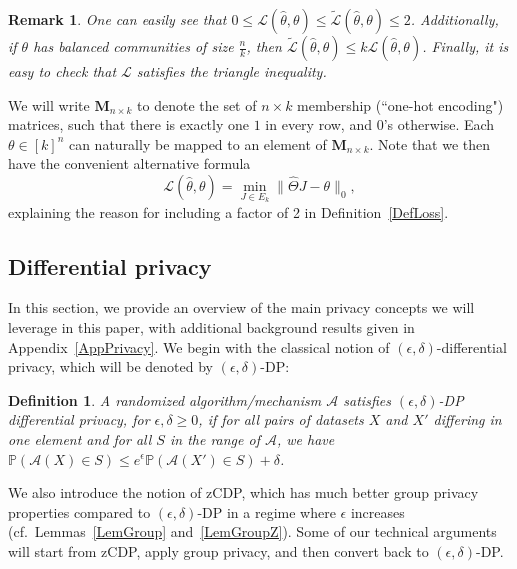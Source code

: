 \documentclass{article}
\newtheorem{remark}{Remark}
\newtheorem{definition}{Definition}
\newcommand{\thetahat}{\ensuremath{\widehat{\theta}}}
\newcommand{\Thetahat}{\ensuremath{\widehat{\Theta}}}
\begin{document}
\begin{remark}
\label{remark:avg<=worst}
One can easily see that $0 \leq \mathcal{L}(\hat{\theta}, \theta) \leq  \widetilde{\mathcal{L}}(\hat{\theta}, \theta) \leq 2$. Additionally, if $\theta$ has balanced communities of size $\frac{n}{k}$, then $\widetilde{\mathcal{L}}(\hat{\theta}, \theta) \leq  k\mathcal{L}(\hat{\theta}, \theta)$. Finally, it is easy to check that $\mathcal{L}$ satisfies the triangle inequality.
\end{remark}

We will write $\mathbf{M}_{n\times k}$ to denote the set of $n \times k$ membership (``one-hot encoding") matrices, such that there is exactly one $1$ in every row, and $0$'s otherwise. Each $\theta \in [k]^n$ can naturally be mapped to an element of $\mathbf{M}_{n \times k}$. Note that we then have the convenient alternative formula
\begin{equation*}
\mathcal{L}(\thetahat, \theta) = \min_{J \in E_k} \|\Thetahat J - \theta\|_0,
\end{equation*}
explaining the reason for including a factor of 2 in Definition~\ref{DefLoss}.


\subsection{Differential privacy}

In this section, we provide an overview of the main privacy concepts we will leverage in this paper, with additional background results given in Appendix~\ref{AppPrivacy}. We begin with the classical notion of $(\epsilon, \delta)$-differential privacy, which will be denoted by $(\epsilon, \delta)$-DP:
\begin{definition}
A randomized algorithm/mechanism $\mathcal{A}$ satisfies $(\epsilon, \delta)$-DP differential privacy, for $\epsilon, \delta \geq 0$, if for all pairs of datasets $X$ and $X'$ differing in one element and for all $S$ in the range of $\mathcal{A}$, we have $\mathbb{P}(\mathcal{A}(X) \in S) \leq e^{\epsilon}\mathbb{P}(\mathcal{A}(X') \in S) + \delta$.
\end{definition}  

We also introduce the notion of zCDP, which has much better group privacy properties compared to $(\epsilon, \delta)$-DP in a regime where $\epsilon$ increases (cf.\ Lemmas~\ref{LemGroup} and~\ref{LemGroupZ}). Some of our technical arguments will start from zCDP, apply group privacy, and then convert back to $(\epsilon, \delta)$-DP.
\end{document}
